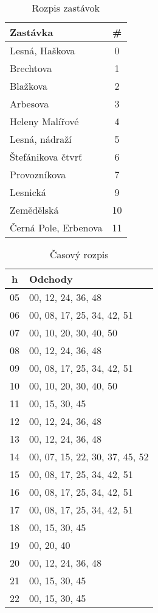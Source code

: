 \begin{table}[h]
  \centering
  \begin{tabular}{|l|c|}
    \hline
    \textbf{Zastávka} & \# \\ \hline
    Lesná, Haškova & 0 \\ \hline
    Brechtova & 1 \\ \hline
    Blažkova & 2 \\ \hline
    Arbesova & 3 \\ \hline
    Heleny Malířové & 4 \\ \hline
    Lesná, nádraží & 5 \\ \hline
    Štefánikova čtvrť & 6 \\ \hline
    Provozníkova & 7 \\ \hline
    Lesnická & 9 \\ \hline
    Zemědělská & 10 \\ \hline
    Černá Pole, Erbenova & 11 \\ \hline
  \end{tabular}
  \caption{Rozpis zastávok}
\end{table}

\begin{table}[h]
  \centering
  \begin{tabular}{|c|l|}
    \hline
    \textbf{h} & \textbf{Odchody} \\ \hline
    05 & 00, 12, 24, 36, 48 \\ \hline
    06 & 00, 08, 17, 25, 34, 42, 51 \\ \hline
    07 & 00, 10, 20, 30, 40, 50 \\ \hline
    08 & 00, 12, 24, 36, 48 \\ \hline
    09 & 00, 08, 17, 25, 34, 42, 51 \\ \hline
    10 & 00, 10, 20, 30, 40, 50 \\ \hline
    11 & 00, 15, 30, 45 \\ \hline
    12 & 00, 12, 24, 36, 48 \\ \hline
    13 & 00, 12, 24, 36, 48 \\ \hline
    14 & 00, 07, 15, 22, 30, 37, 45, 52 \\ \hline
    15 & 00, 08, 17, 25, 34, 42, 51 \\ \hline
    16 & 00, 08, 17, 25, 34, 42, 51 \\ \hline
    17 & 00, 08, 17, 25, 34, 42, 51 \\ \hline
    18 & 00, 15, 30, 45 \\ \hline
    19 & 00, 20, 40 \\ \hline
    20 & 00, 12, 24, 36, 48 \\ \hline
    21 & 00, 15, 30, 45 \\ \hline
    22 & 00, 15, 30, 45 \\ \hline
  \end{tabular}
  \caption{Časový rozpis}
\end{table}

